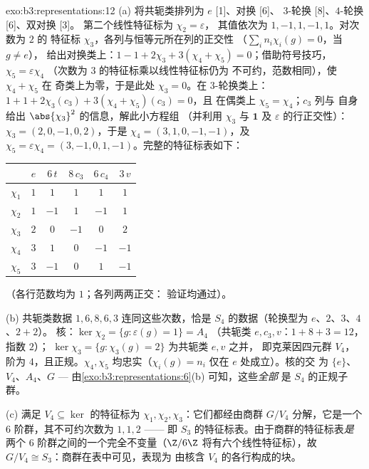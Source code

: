 \begin{solution}{exo:b3:representations:12}
(a) 将共轭类排列为 $e$ [1]、对换 [6]、
$3$-轮换 [8]、$4$-轮换 [6]、双对换 [3]。
第二个线性特征标为 $\chi_2 = \varepsilon$，
其值依次为 $1, -1, 1, -1, 1$。对次数为 $2$ 的
特征标 $\chi_3$，各列与恒等元所在列的正交性
（$\sum_in_i\chi_i(g) = 0$，当 $g \neq e$），
给出对换类上：$1 - 1 + 2\chi_3 + 3(\chi_4 +
\chi_5) = 0$；借助符号技巧，$\chi_5 = \varepsilon\chi_4$
（次数为 $3$ 的特征标乘以线性特征标仍为
不可约，范数相同），使 $\chi_4 + \chi_5$ 在
奇类上为零，于是此处 $\chi_3 = 0$。在 $3$-轮换类上：$1 + 1 +
2\chi_3(c_3) + 3(\chi_4 + \chi_5)(c_3) = 0$，且
在偶类上 $\chi_5 = \chi_4$；$c_3$ 列与
自身给出 $\abs{\chi_3}^2$ 的信息，解此小方程组
（并利用 $\chi_3$ 与 $\mathbf 1$ 及
$\varepsilon$ 的行正交性）：$\chi_3 = (2, 0, -1, 0, 2)$，于是 $\chi_4 =
(3, 1, 0, -1, -1)$，及 $\chi_5 = \varepsilon\chi_4 = (3, -1,
0, 1, -1)$。完整的特征标表如下：
\begin{center}
\begin{tabular}{c|ccccc}
 & $e$ & $6\,t$ & $8\,c_3$ & $6\,c_4$ & $3\,v$\\
\hline
$\chi_1$ & $1$ & $1$ & $1$ & $1$ & $1$\\
$\chi_2$ & $1$ & $-1$ & $1$ & $-1$ & $1$\\
$\chi_3$ & $2$ & $0$ & $-1$ & $0$ & $2$\\
$\chi_4$ & $3$ & $1$ & $0$ & $-1$ & $-1$\\
$\chi_5$ & $3$ & $-1$ & $0$ & $1$ & $-1$\\
\end{tabular}
\end{center}
（各行范数均为 $1$；各列两两正交：
验证均通过）。

(b) 共轭类数据 $1, 6, 8, 6, 3$ 连同这些次数，恰是
$S_4$ 的数据（轮换型为 $e$、$2$、$3$、$4$、$2{+}2$）。
核：$\ker\chi_2 = \{g : \varepsilon(g) = 1\} = A_4$
（共轭类 $e, c_3, v$：$1 + 8 + 3 = 12$，指数 $2$）；
$\ker\chi_3 = \{g : \chi_3(g) = 2\}$ 为共轭类 $e, v$ 之并，
即克莱因四元群 $V_4$，阶为 $4$，且正规。$\chi_4, \chi_5$
均忠实（$\chi_i(g) = n_i$ 仅在 $e$ 处成立）。核的交
为 $\{e\}$、$V_4$、$A_4$、$G$ ---
由\cref{exo:b3:representations:6}(b) 可知，这些\emph{全部}
是 $S_4$ 的正规子群。

(c) 满足 $V_4 \subseteq \ker$ 的特征标为 $\chi_1,
\chi_2, \chi_3$：它们都经由商群 $G/V_4$ 分解，它是一个
$6$ 阶群，其不可约次数为 $1, 1, 2$ ——
即 $S_3$ 的特征标表。由于商群的特征标表\emph{是}
两个 $6$ 阶群之间的一个完全不变量（$\Z/6\Z$
将有六个线性特征标），故 $G/V_4 \cong
S_3$：商群在表中可见，表现为
由核含 $V_4$ 的各行构成的块。
\end{solution}


